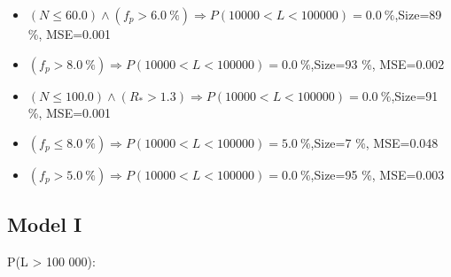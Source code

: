 \documentclass[numbered]{CSL}
\begin{document}
\begin{itemize}
\item $(N \leq 60.0) \land (f_p > 6.0~\%) \Rightarrow P(10 000 < L < 100 000) = 0.0~\%$,\hfill Size=89 \%, MSE=0.001
\item $(f_p > 8.0~\%) \Rightarrow P(10 000 < L < 100 000) = 0.0~\%$,\hfill Size=93 \%, MSE=0.002
\item $(N \leq 100.0) \land (R_* > 1.3) \Rightarrow P(10 000 < L < 100 000) = 0.0~\%$,\hfill Size=91 \%, MSE=0.001
\item $(f_p \leq 8.0~\%) \Rightarrow P(10 000 < L < 100 000) = 5.0~\%$,\hfill Size=7 \%, MSE=0.048
\item $(f_p > 5.0~\%) \Rightarrow P(10 000 < L < 100 000) = 0.0~\%$,\hfill Size=95 \%, MSE=0.003
\end{itemize}

\subsection{Model I}
P(L > 100 000):
\end{document}
